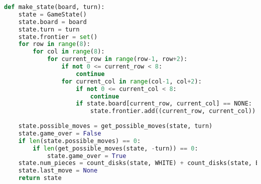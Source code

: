 \begin{lstlisting}[language=Python]
def make_state(board, turn):
    state = GameState()
    state.board = board
    state.turn = turn
    state.frontier = set()
    for row in range(8):
        for col in range(8):
            for current_row in range(row-1, row+2):
                if not 0 <= current_row < 8:
                    continue
                for current_col in range(col-1, col+2):
                    if not 0 <= current_col < 8:
                        continue
                    if state.board[current_row, current_col] == NONE:
                        state.frontier.add((current_row, current_col))
            
    state.possible_moves = get_possible_moves(state, turn)
    state.game_over = False
    if len(state.possible_moves) == 0:
        if len(get_possible_moves(state, -turn)) == 0:
            state.game_over = True
    state.num_pieces = count_disks(state, WHITE) + count_disks(state, BLACK)
    state.last_move = None
    return state
\end{lstlisting}
